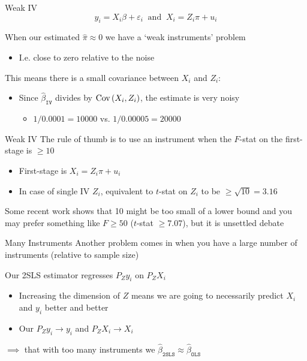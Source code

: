 \documentclass[aspectratio=169,t,11pt,table]{beamer}
\begin{document}
\begin{frame}{Weak IV}
  \vspace{-\bigskipamount}
  $$
    y_i = X_i \beta + \varepsilon_i \ \text{ and }\  X_i = Z_i \pi  + u_i
  $$
  
  \bigskip
  When our estimated $\hat{\pi} \approx 0$ we have a `weak instruments' problem
  \begin{itemize}
    \item I.e. close to zero relative to the noise
  \end{itemize}

  \pause
  \bigskip
  This means there is a small covariance between $X_i$ and $Z_i$:
  \begin{itemize}
    \item Since $\hat{\beta}_{\texttt{IV}}$ divides by $\cov{X_i, Z_i}$, the estimate is very noisy 
    \begin{itemize}
      \item $1/0.0001 = 10000$ vs. $1/0.00005 = 20000$
    \end{itemize}
  \end{itemize}
\end{frame}

\begin{frame}{Weak IV}
  The rule of thumb is to use an instrument when the $F$-stat on the first-stage is $\geq 10$
  \begin{itemize}
    \item First-stage is $X_i = Z_i \pi + u_i$ 
    
    \item In case of single IV $Z_i$, equivalent to $t$-stat on $Z_i$ to be $\geq \sqrt{10} = 3.16$
  \end{itemize}

  \pause
  \bigskip
  Some recent work shows that 10 might be too small of a lower bound and you may prefer something like $F \geq 50$ ($t$-stat $\geq 7.07$), but it is unsettled debate
\end{frame}

\begin{frame}{Many Instruments}
  Another problem comes in when you have a large number of instruments (relative to sample size)

  \bigskip
  Our 2SLS estimator regresses $P_Z y_i$ on $P_Z X_i$
  \begin{itemize}
    \item Increasing the dimension of $Z$ means we are going to necessarily predict $X_i$ and $y_i$ better and better
    
    \item Our $P_Z y_i \to y_i$ and $P_Z X_i \to X_i$
  \end{itemize}

  \bigskip
  \pause
  $\implies$ that with too many instruments we $\hat{\beta}_{\texttt{2SLS}} \approx \hat{\beta}_{\texttt{OLS}}$
\end{frame}
\end{document}
